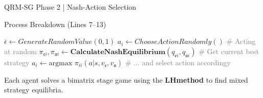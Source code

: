 \documentclass[10pt, aspectratio=169]{beamer}
\newcommand{\evidenzia}[1]{\textcolor{verdeSalvia}{\textbf{#1}}}
\begin{document}
\begin{frame}{QRM-SG Phase 2 | Nash-Action Selection}
    \begin{block}{Process Breakdown (Lines 7--13)}
    \begin{algorithmic}
        \vspace{0.2cm}
        \STATE {\footnotesize \textcolor{gray}{\# for each episode, for each time step $t$:}}
        \STATE $\bar \epsilon \leftarrow GenerateRandomValue(0,1)$
        \IF{$\overline{\epsilon} < \epsilon$} 
            \STATE $a_i \leftarrow ChooseActionRandomly()$ {\footnotesize \textcolor{gray}{\# Acting at random}}
        \ELSE 
                \STATE $\pi_{\mathfrak{e}i}, \pi_{\mathfrak{a}i} \leftarrow {\textbf{CalculateNashEquilibrium}}(q_{\mathfrak{e}i}, q_{\mathfrak{a}i})$ {\footnotesize \textcolor{gray}{\# Get current best strategy}}
                \STATE $a_i \leftarrow \text{argmax } \pi_{ii}(a|s, v_{\mathfrak{e}}, v_{\mathfrak{a}})$  {\footnotesize \textcolor{gray}{\# ... and select action accordingy}}
            \ENDFOR
        \ENDIF
    \end{algorithmic}
    \end{block}
    Each agent solves a bimatrix stage game using the \evidenzia{LHmethod} to find mixed strategy equilibria.
\end{frame}
\end{document}
